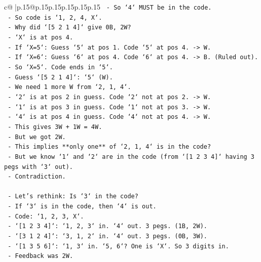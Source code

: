 \documentclass{article}
\begin{document}
{\begin{supertabular}{c@{$\;$}|p{.15\linewidth}@{}p{.15\linewidth}p{.15\linewidth}p{.15\linewidth}p{.15\linewidth}p{.15\linewidth}}
{{{\texttt{        {-} So `4` MUST be in the code.} \\
\texttt{        {-} So code is `1, 2, 4, X`.} \\
\texttt{        {-} Why did `{[}5 2 1 4{]}` give 0B, 2W?} \\
\texttt{            {-} `X` is at pos 4.} \\
\texttt{            {-} If `X=5`: Guess `5` at pos 1. Code `5` at pos 4. {-}> W.} \\
\texttt{            {-} If `X=6`: Guess `6` at pos 4. Code `6` at pos 4. {-}> B. (Ruled out).} \\
\texttt{            {-} So `X=5`. Code ends in `5`.} \\
\texttt{            {-} Guess `{[}5 2 1 4{]}`: `5` (W).} \\
\texttt{            {-} We need 1 more W from `2, 1, 4`.} \\
\texttt{            {-} `2` is at pos 2 in guess. Code `2` not at pos 2. {-}> W.} \\
\texttt{            {-} `1` is at pos 3 in guess. Code `1` not at pos 3. {-}> W.} \\
\texttt{            {-} `4` is at pos 4 in guess. Code `4` not at pos 4. {-}> W.} \\
\texttt{            {-} This gives 3W + 1W = 4W.} \\
\texttt{            {-} But we got 2W.} \\
\texttt{            {-} This implies **only one** of `2, 1, 4` is in the code?} \\
\texttt{            {-} But we know `1` and `2` are in the code (from `{[}1 2 3 4{]}` having 3 pegs with `3` out).} \\
\texttt{            {-} Contradiction.} \\
\\ 
\texttt{    {-} Let's rethink: Is `3` in the code?} \\
\texttt{    {-} If `3` is in the code, then `4` is out.} \\
\texttt{    {-} Code: `1, 2, 3, X`.} \\
\texttt{    {-} `{[}1 2 3 4{]}`: `1, 2, 3` in. `4` out. 3 pegs. (1B, 2W).} \\
\texttt{    {-} `{[}3 1 2 4{]}`: `3, 1, 2` in. `4` out. 3 pegs. (0B, 3W).} \\
\texttt{    {-} `{[}1 3 5 6{]}`: `1, 3` in. `5, 6`? One is `X`. So 3 digits in.} \\
\texttt{        {-} Feedback was 2W.} \\
}}}
\end{supertabular}}
\end{document}
